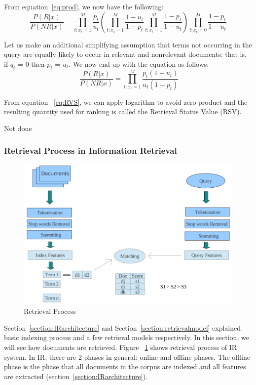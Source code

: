 From equation~\ref{eq:prod}, we now have the following:
\begin{equation}
\frac{P(R|x)}{P(NR|x)} = \prod_{t:x_t=1}^M\frac{p_t}{u_t} (\prod_{t:x_t=1}^M\frac{1-u_t}{1-p_t}\prod_{t:x_t=1}^M\frac{1-p_t}{1-u_t})
  \prod_{t:x_t=0}^M\frac{1-p_t}{1-u_t}
\end{equation}

Let us make an additional simplifying assumption that terms not occurring in the query are equally likely to occur in relevant and nonrelevant documents: 
that is, if $q_t$ = 0 then $p_t$ = $u_t$. We now end up with the equation as follows:
\begin{equation}~\label{eq:RVS}
\frac{P(R|x)}{P(NR|x)} = \prod_{t:x_t=1}^M\frac{p_t(1-u_t)}{u_t(1-p_t)}
\end{equation}

From equation ~\ref{eq:RVS}, we can apply logarithm to avoid zero product and the resulting quantity used for ranking is
called the Retrieval Status Value (RSV).

Not done

\subsubsection{Retrieval Process in Information Retrieval}\label{section:retrieving}
\begin{figure}
\centering
\includegraphics[scale=0.3]{./figures/retrieval.png}
\caption{Retrieval Process} \label{fig:retrieval} 
\end{figure}
Section~\ref{section:IRarchitecture} and Section~\ref{section:retrievalmodel} explained basic indexing process and a few retrieval models respectively.
In this section, we will see how documents are retrieved. Figure ~\ref{fig:retrieval} shows
retrieval process of IR system. In IR, there are 2 phases in general:
online and offline phases. The offline phase is the phase that all documents in the corpus are indexed and all features are extracted 
(section~\ref{section:IRarchitecture}). 

